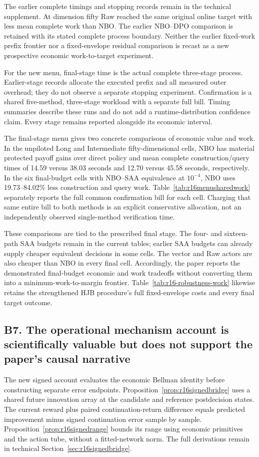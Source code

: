 The earlier complete timings and stopping records remain in the technical supplement. At dimension fifty Raw reached the same original online target with less mean complete work than NBO. The earlier NBO--DPO comparison is retained with its stated complete process boundary. Neither the earlier fixed-work prefix frontier nor a fixed-envelope residual comparison is recast as a new prospective economic work-to-target experiment.

For the new menu, final-stage time is the actual complete three-stage process. Earlier-stage records allocate the executed prefix and all measured outer overhead; they do not observe a separate stopping experiment. Confirmation is a shared five-method, three-stage workload with a separate full bill. Timing summaries describe these runs and do not add a runtime-distribution confidence claim. Every stage remains reported alongside its economic interval.

The final-stage menu gives two concrete comparisons of economic value and work. In the unpiloted Long and Intermediate fifty-dimensional cells, NBO has material protected payoff gains over direct policy and mean complete construction/query times of 14.59 versus 38.03 seconds and 12.70 versus 45.58 seconds, respectively. In the six final-budget cells with NBO--SAA equivalence at $10^{-4}$, NBO uses 19.73--84.02\% less construction and query work. Table~\ref{tab:r16menusharedwork} separately reports the full common confirmation bill for each cell. Charging that same entire bill to both methods is an explicit conservative allocation, not an independently observed single-method verification time.

These comparisons are tied to the prescribed final stage. The four- and sixteen-path SAA budgets remain in the current tables; earlier SAA budgets can already supply cheaper equivalent decisions in some cells. The vector and Raw actors are also cheaper than NBO in every final cell. Accordingly, the paper reports the demonstrated final-budget economic and work tradeoffs without converting them into a minimum-work-to-margin frontier. Table~\ref{tab:r16-robustness-work} likewise retains the strengthened HJB procedure's full fixed-envelope costs and every final target outcome.

\subsection*{B7. The operational mechanism account is scientifically valuable but does not support the paper's causal narrative}\label{resp:B7}
The new signed account evaluates the economic Bellman identity before constructing separate error endpoints. Proposition~\ref{prop:r16signedbridge} uses a shared future innovation array at the candidate and reference postdecision states. The current reward plus paired continuation-return difference equals predicted improvement minus signed continuation error sample by sample. Proposition~\ref{prop:r16signedrange} bounds its range using economic primitives and the action tube, without a fitted-network norm. The full derivations remain in technical Section~\ref{sec:r16signedbridge}.

